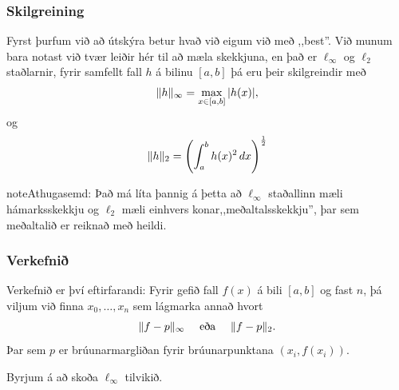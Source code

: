 \documentclass[a4paper,10pt,icelandic]{sphinxmanual}
\begin{document}
\subsubsection{Skilgreining}
\label{kafli03:index-14}\label{kafli03:skilgreining}
Fyrst þurfum við að útskýra betur hvað við eigum við með ,,best”. Við
munum bara notast við tvær leiðir hér til að mæla skekkjuna, en það er
\(\ell_\infty\) og \(\ell_2\) staðlarnir, fyrir samfellt fall
\(h\) á bilinu \([a,b]\) þá eru þeir skilgreindir með
\begin{gather}
\begin{split}\|h\|_\infty  = \max_{x\in[a,b]} |h(x)|,\end{split}\notag
\end{gather}
og
\begin{gather}
\begin{split}\|h\|_2 = \left( \int_a^b h(x)^2\, dx \right)^\frac 12\end{split}\notag
\end{gather}
\begin{notice}{note}{Athugasemd:}
Það má líta þannig á þetta að \(\ell_\infty\) staðallinn
mæli hámarksskekkju og \(\ell_2\) mæli einhvers konar,,meðaltalsskekkju'',
þar sem meðaltalið er reiknað með heildi.
\end{notice}


\subsubsection{Verkefnið}
\label{kafli03:verkefni}
Verkefnið er því eftirfarandi: Fyrir gefið fall \(f(x)\) á bili
\([a,b]\) og fast \(n\), þá viljum við finna
\(x_0,\ldots,x_n\) sem lágmarka annað hvort
\begin{gather}
\begin{split}\|f-p\|_\infty \quad \text{ eða } \quad \|f-p\|_2.\end{split}\notag
\end{gather}
Þar sem \(p\) er brúunarmargliðan fyrir brúunarpunktana
\((x_i,f(x_i))\).

Byrjum á að skoða \(\ell_\infty\) tilvikið.

\end{document}
